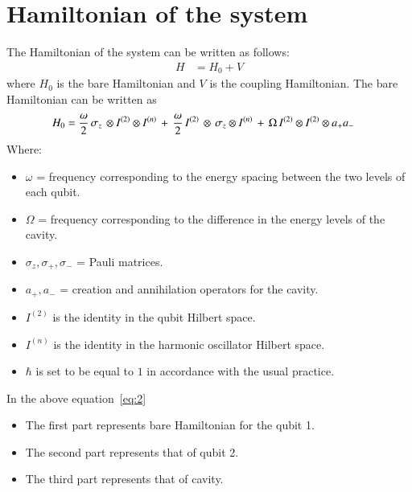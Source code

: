 \section{Hamiltonian of the system}
The Hamiltonian of the system can be written as follows:
\begin{align}\label{eq:1}
H &= H_{0} + V
\end{align}
where $H_{0}$ is the bare Hamiltonian and $V$ is the coupling Hamiltonian. 
The bare Hamiltonian can be written as
\begin{align}\label{eq:2}
{H}_{0}&=\frac{\omega}{2}\thinspace{\sigma}_{z}\thinspace\otimes I^{(2)}\otimes{I^{(n)}}\thinspace + \thinspace\frac{\omega}{2}\thinspace{I^{(2)}}\thinspace\otimes\thinspace{\sigma}_{z}\otimes{I^{(n)}}\thinspace+\thinspace\Omega\thinspace I^{(2)}\otimes I^{(2)}\otimes{a}_{+}{a}_{- }
\end{align}
Where: 
\begin{itemize}
\item $\omega$ = frequency corresponding to the energy spacing  between the two levels of each qubit.
\item $\Omega$ = frequency corresponding to the difference in the energy levels of the cavity.
\item ${\sigma}_{z}, {\sigma}_{+}, {\sigma}_{-}$ =  Pauli matrices.   
\item ${a}_{+}, {a}_{-}$ = creation and annihilation operators for the cavity.
\item $I^{(2)}$ is the identity in the qubit Hilbert space.
\item $I^{(n)}$ is the identity in the harmonic oscillator Hilbert space.
\item $\hbar$ is set to be equal to $1$ in accordance with the usual practice. 
\end{itemize}
In the above equation~\eqref{eq:2} %
\begin{itemize}
\item The first part represents bare Hamiltonian for the qubit 1.
\item The second part represents that of qubit 2.
\item The third  part represents that of  cavity. 
\end{itemize}

